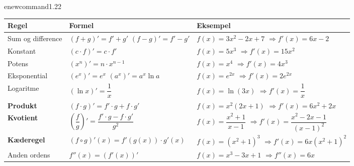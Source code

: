 \documentclass[11pt,a4paper]{article}
\begin{document}
\begin{center}

enewcommand{\arraystretch}{1.22}
\begin{tabular}{@{}p{3.2cm}p{5.5cm}p{6.8cm}@{}}
\toprule
\textbf{Regel} & \textbf{Formel} & \textbf{Eksempel} \\
\midrule
Sum og
difference &
$(f + g)' = f' + g'$ \newline
$(f - g)' = f' - g'$ &
$f(x) = 3x^{2} - 2x + 7$ \newline
$\Rightarrow f'(x) = 6x - 2$ \\[5pt]

Konstant &
$(c \cdot f)' = c \cdot f'$ &
$f(x) = 5x^{3}$ \newline
$\Rightarrow f'(x) = 15x^{2}$ \\[5pt]

Potens &
$(x^{n})' = n \cdot x^{n-1}$ &
$f(x) = x^{4}$ \newline
$\Rightarrow f'(x) = 4x^{3}$ \\[5pt]

Eksponential &
$(e^{x})' = e^{x}$ \newline
$(a^{x})' = a^{x} \ln a$ &
$f(x) = e^{2x}$ \newline
$\Rightarrow f'(x) = 2e^{2x}$ \\[5pt]

Logaritme &
$(\ln x)' = \dfrac{1}{x}$ &
$f(x) = \ln(3x)$ \newline
$\Rightarrow f'(x) = \dfrac{1}{x}$ \\[5pt]

\textbf{Produkt} &
$(f \cdot g)' = f' \cdot g + f \cdot g'$ &
$f(x) = x^{2}(2x+1)$ \newline
$\Rightarrow f'(x) = 6x^{2} + 2x$ \\[5pt]

\textbf{Kvotient} &
$\left(\dfrac{f}{g}\right)' =
 \dfrac{f' \cdot g - f \cdot g'}{g^{2}}$ &
$f(x) = \dfrac{x^{2}+1}{x-1}$ \newline
$\Rightarrow f'(x) = \dfrac{x^{2}-2x-1}{(x-1)^{2}}$ \\[5pt]

\textbf{Kæderegel} &
$(f \circ g)'(x) = f'\!\left(g(x)\right) \cdot g'(x)$ &
$f(x) = (x^{2}+1)^{3}$ \newline
$\Rightarrow f'(x) = 6x(x^{2}+1)^{2}$ \\[5pt]

Anden ordens &
$f''(x) = \left(f'(x)\right)'$ &
$f(x) = x^{3} - 3x + 1$ \newline
$\Rightarrow f''(x) = 6x$ \\
\bottomrule
\end{tabular}
\end{center}
\end{document}

